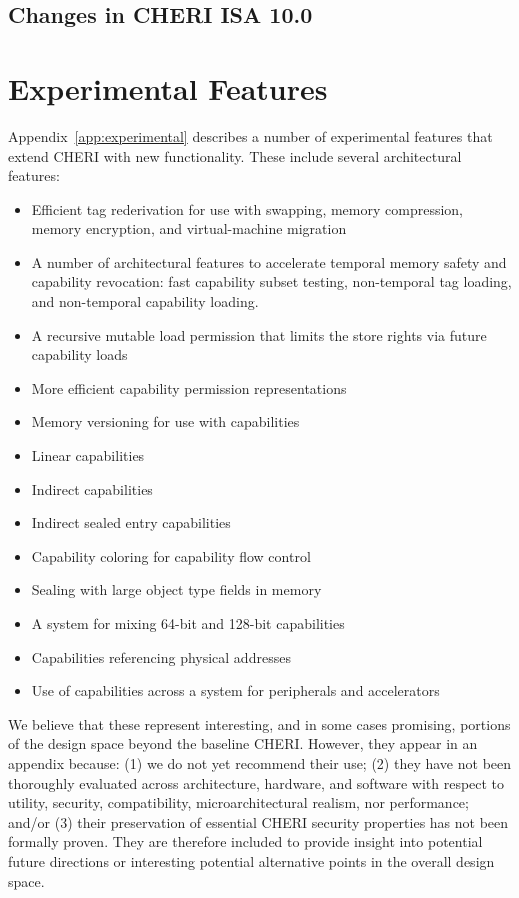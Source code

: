 \subsection{Changes in CHERI ISA 10.0}



\section{Experimental Features}
\label{sec:intro:experimental}


Appendix~\ref{app:experimental} describes a number of experimental features
that extend CHERI with new functionality.
These include several architectural features:

\begin{itemize}
\item Efficient tag rederivation for use with swapping, memory compression,
  memory encryption, and virtual-machine migration
\item A number of architectural features to accelerate temporal memory safety
  and capability revocation: fast capability subset testing, non-temporal
  tag loading, and non-temporal capability loading.
\item A recursive mutable load permission that limits the store rights
  via future capability loads
\item More efficient capability permission representations
\item Memory versioning for use with capabilities
\item Linear capabilities
\item Indirect capabilities
\item Indirect sealed entry capabilities
\item Capability coloring for capability flow control
\item Sealing with large object type fields in memory
\item A system for mixing 64-bit and 128-bit capabilities
\item Capabilities referencing physical addresses
\item Use of capabilities across a system for peripherals and accelerators
\end{itemize}

We believe that these represent interesting, and in some cases promising,
portions of the design space beyond the baseline CHERI.
However, they appear in an appendix because: (1) we do not yet recommend their
use; (2) they have not been thoroughly evaluated across architecture,
hardware, and software with respect to utility, security, compatibility,
microarchitectural realism, nor performance; and/or (3) their preservation of
essential CHERI security properties has not been formally proven.
They are therefore included to provide insight into potential future
directions or interesting potential alternative points in the overall design
space.

